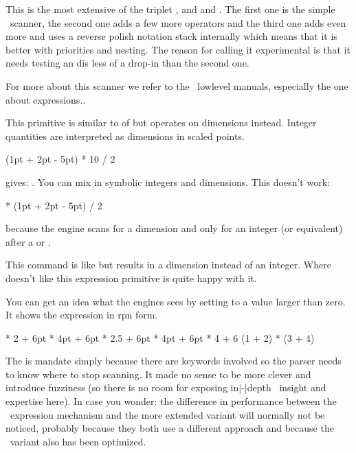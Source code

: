 \startnewprimitive[title={\prm {dimexperimental}}]

This is the most extensive of the triplet , 
and and . The first one is the simple \ETEX\ scanner, the
second one adds a few more operators and the third one adds even more and uses a
reverse polish notation stack internally which means that it is better with
priorities and nesting. The reason for calling it experimental is that it needs
testing an dis less of a drop-in than the second one.

For more about this scanner we refer to the \CONTEXT\ lowlevel manuals,
especially the one about expressions..

\stopnewprimitive

\startoldprimitive[title={\prm {dimexpr}}]

This primitive is similar to of  but operates on dimensions
instead. Integer quantities are interpreted as dimensions in scaled points.

\startbuffer
\the\dimexpr (1pt + 2pt - 5pt) * 10 / 2 \relax
\stopbuffer

\typebuffer

gives: \inlinebuffer. You can mix in symbolic integers and dimensions. This doesn't work:

\startbuffer
\the{} * (1pt + 2pt - 5pt) / 2 \relax
\stopbuffer

because the engine scans for a dimension and only for an integer (or equivalent)
after a \type {*} or \type {/}.


\stopoldprimitive

\startnewprimitive[title={\prm {dimexpression}}]

This command is like  but results in a dimension instead of
an integer. Where  doesn't like  this expression
primitive is quite happy with it.

You can get an idea what the engines sees by setting 
to a value larger than zero. It shows the expression in rpn form.

\starttyping
\dimexpression 4pt * 2   + 6pt   \relax
{}   * 4pt + 6pt   \relax
\dimexpression 4pt * 2.5 + 6pt   \relax
{} * 4pt + 6pt   \relax
{} * 4 + 6         \relax
\numexpression (1 + 2) * (3 + 4) \relax
\stoptyping

The  is mandate simply because there are keywords involved so the
parser needs to know where to stop scanning. It made no sense to be more clever
and introduce fuzziness (so there is no room for exposing in|-|depth \TEX\
insight and expertise here). In case you wonder: the difference in performance
between the \ETEX\ expression mechanism and the more extended variant will
normally not be noticed, probably because they both use a different approach and
because the \ETEX\ variant also has been optimized.

